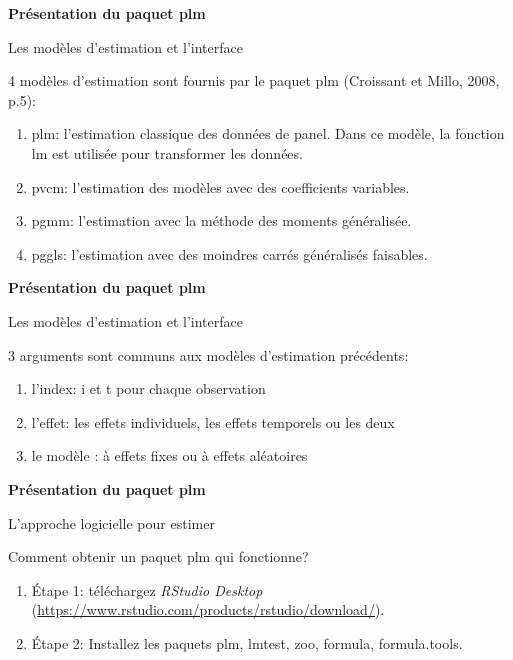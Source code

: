 \documentclass{beamer}
\begin{document}
\begin{frame}{\textbf{Pr\'esentation du paquet plm}}
\begin{block}{Les mod\`eles d'estimation et l'interface}
\end{block}
4 mod\`eles d'estimation sont fournis par le paquet plm (Croissant et Millo, 2008, p.5):
\begin{enumerate}
\item plm: l'estimation classique des donn\'ees de panel. Dans ce mod\`ele, la fonction lm est utilis\'ee pour transformer les donn\'ees. 
\item pvcm: l'estimation des mod\`eles avec des coefficients variables. 
\item pgmm: l'estimation avec la m\'ethode des moments g\'en\'eralis\'ee.
\item pggls: l'estimation avec des moindres carr\'es g\'en\'eralis\'es faisables.
\end{enumerate} 
\end{frame}
\begin{frame}{\textbf{Pr\'esentation du paquet plm}}
\begin{block}{Les mod\`eles d'estimation et l'interface}
\end{block}
3 arguments sont communs aux mod\`eles d'estimation pr\'ec\'edents:
\begin{enumerate}
\item  l'index: i et t pour chaque observation
\item  l'effet: les effets individuels, les effets temporels ou les deux
\item  le mod\`ele : \`a effets fixes ou \`a effets al\'eatoires
\end{enumerate} 
\end{frame}
\begin{frame}{\textbf{Pr\'esentation du paquet plm}}
\begin{block}{L'approche logicielle pour estimer}
\end{block}
Comment obtenir un paquet plm qui fonctionne?
\begin{enumerate}
\item  \'Etape 1: t\'el\'echargez \textit{RStudio Desktop} (\url{https://www.rstudio.com/products/rstudio/download/}). 
\item  \'Etape 2: Installez les paquets plm, lmtest, zoo, formula, formula.tools. 
\end{enumerate} 
\end{frame}
\end{document}
